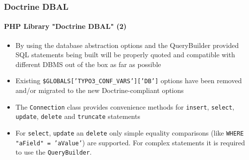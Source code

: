 \begin{frame}[fragile]
	\frametitle{Doctrine DBAL}
	\framesubtitle{PHP Library "Doctrine DBAL" (2)}

	\begin{itemize}

		\item By using the database abstraction options and the QueryBuilder
			provided SQL statements being built will be properly quoted and compatible
			with different DBMS out of the box as far as possible

		\item Existing \texttt{\$GLOBALS['TYPO3\_CONF\_VARS']['DB']} options have been
			removed and/or migrated to the new Doctrine-compliant options

		\item The \texttt{Connection} class provides convenience methods for
			\texttt{insert}, \texttt{select}, \texttt{update}, \texttt{delete} and
			\texttt{truncate} statements

		\item For \texttt{select}, \texttt{update} an \texttt{delete} only simple
			equality comparisons (like \texttt{WHERE "aField" = 'aValue'}) are supported.
			For complex statements it is required to use the \texttt{QueryBuilder}.

	\end{itemize}

\end{frame}

